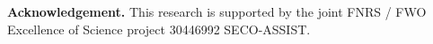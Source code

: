 \maketitle
	






\textbf{Acknowledgement.} This research is supported by the joint FNRS / FWO Excellence of Science project 30446992 SECO-ASSIST.

\newpage






